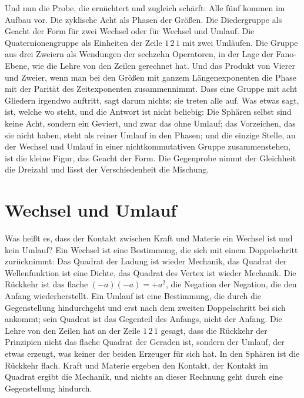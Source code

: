 \documentclass[11pt,a4paper]{article}
\newcommand{\Randlesart}{\marginpar{\raggedright\footnotesize\textcolor{lesart}{$\bigcirc$\,Lesart}}}
\begin{document}
Und nun die Probe, die ernüchtert und zugleich schärft: Alle fünf kommen im Aufbau vor. Die zyklische Acht als Phasen der Größen. Die Diedergruppe als Geacht der Form für zwei Wechsel oder für Wechsel und Umlauf. Die Quaternionengruppe als Einheiten der Zeile $1\,2\,1$ mit zwei Umläufen. Die Gruppe aus drei Zweiern als Wendungen der sechzehn Operatoren, in der Lage der Fano-Ebene, wie die Lehre von den Zeilen gerechnet hat. Und das Produkt von Vierer und Zweier, wenn man bei den Größen mit ganzem Längenexponenten die Phase mit der Parität des Zeitexponenten zusammennimmt. Dass eine Gruppe mit acht Gliedern irgendwo auftritt, sagt darum nichts; sie treten alle auf. Was etwas sagt, ist, welche wo steht, und die Antwort ist nicht beliebig: Die Sphären selbst sind keine Acht, sondern ein Geviert, und zwar das ohne Umlauf; das Vorzeichen, das sie nicht haben, steht als reiner Umlauf in den Phasen; und die einzige Stelle, an der Wechsel und Umlauf in einer nichtkommutativen Gruppe zusammenstehen, ist die kleine Figur, das Geacht der Form. Die Gegenprobe nimmt der Gleichheit die Dreizahl und lässt der Verschiedenheit die Mischung.

\section{Wechsel und Umlauf}
\label{sec:lesart}

\Randlesart Was heißt es, dass der Kontakt zwischen Kraft und Materie ein Wechsel ist und kein Umlauf? Ein Wechsel ist eine Bestimmung, die sich mit einem Doppelschritt zurücknimmt: Das Quadrat der Ladung ist wieder Mechanik, das Quadrat der Wellenfunktion ist eine Dichte, das Quadrat des Vertex ist wieder Mechanik. Die Rückkehr ist das flache $(-a)(-a)=+a^2$, die Negation der Negation, die den Anfang wiederherstellt. Ein Umlauf ist eine Bestimmung, die durch die Gegenstellung hindurchgeht und erst nach dem zweiten Doppelschritt bei sich ankommt; sein Quadrat ist das Gegenteil des Anfangs, nicht der Anfang. Die Lehre von den Zeilen hat an der Zeile $1\,2\,1$ gesagt, dass die Rückkehr der Prinzipien nicht das flache Quadrat der Geraden ist, sondern der Umlauf, der etwas erzeugt, was keiner der beiden Erzeuger für sich hat. In den Sphären ist die Rückkehr flach. Kraft und Materie ergeben den Kontakt, der Kontakt im Quadrat ergibt die Mechanik, und nichts an dieser Rechnung geht durch eine Gegenstellung hindurch.
\end{document}
